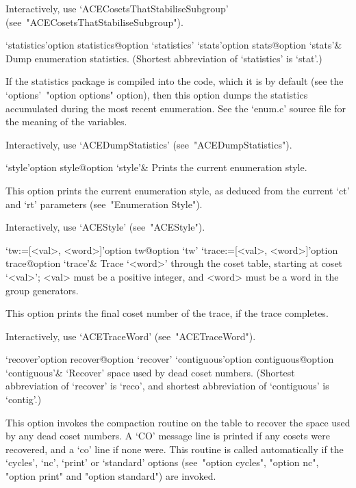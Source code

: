 Interactively,          use           `ACECosetsThatStabiliseSubgroup'
(see~"ACECosetsThatStabiliseSubgroup").

\>`statistics'{option statistics}@{option `statistics'}
\>`stats'{option stats}@{option `stats'}&
Dump enumeration statistics.
(Shortest abbreviation of `statistics' is `stat'.)

If the statistics package is compiled into the {\ACE} code,  which  it
is by default (see the `options'~"option options" option),  then  this
option  dumps  the  statistics  accumulated  during  the  most  recent
enumeration. See the `enum.c' source  file  for  the  meaning  of  the
variables.

Interactively, use `ACEDumpStatistics' (see~"ACEDumpStatistics").

\>`style'{option style}@{option `style'}&
Prints the current enumeration style.

This option prints the current enumeration style, as deduced from  the
current `ct' and `rt' parameters (see~"Enumeration Style").

Interactively, use `ACEStyle' (see~"ACEStyle").

\>`tw:=[<val>, <word>]'{option tw}@{option `tw'}
\>`trace:=[<val>, <word>]'{option trace}@{option `trace'}&
Trace `<word>' through the coset table,  starting  at  coset  `<val>';
<val> must be a positive integer, and <word> must be  a  word  in  the
group generators.

This option prints the final coset number of the trace, if  the  trace
completes.

Interactively, use `ACETraceWord' (see~"ACETraceWord").

\enditems


\beginitems

\>`recover'{option recover}@{option `recover'}
\>`contiguous'{option contiguous}@{option `contiguous'}&
`Recover' space used by dead coset numbers.
(Shortest  abbreviation  of  `recover'   is   `reco',   and   shortest
abbreviation of `contiguous' is `contig'.)

This option invokes the compaction routine on the table to recover the
space used by any dead coset numbers. A `CO' message line  is  printed
if any cosets were recovered, and a  `co'  line  if  none  were.  This
routine is called automatically if  the  `cycles',  `nc',  `print'  or
`standard' options (see~"option cycles", "option nc",  "option  print"
and "option standard") are invoked.

